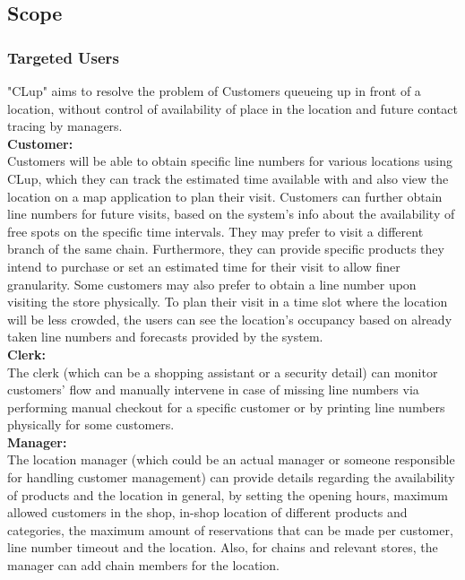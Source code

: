 
\subsection{Scope}

\subsubsection{Targeted Users}

"CLup" aims to resolve the problem of Customers queueing up in front of a location, without control of availability of place in the location and future contact tracing by managers.
\\[0.5cm]
\textbf{Customer:} \\

Customers will be able to obtain specific line numbers for various locations using CLup, which they can track the estimated time available with and also view the location on a map application to plan their visit.
Customers can further obtain line numbers for future visits, based on the system's info about the availability of free spots on the specific time intervals.
They may prefer to visit a different branch of the same chain.
Furthermore, they can provide specific products they intend to purchase or set an estimated time for their visit to allow finer granularity.
Some customers may also prefer to obtain a line number upon visiting the store physically.
To plan their visit in a time slot where the location will be less crowded, the users can see the location's occupancy based on already taken line numbers and forecasts provided by the system.
\\[0.5cm]
\textbf{Clerk:} \\
The clerk (which can be a shopping assistant or a security detail) can monitor customers' flow and manually intervene in case of missing line numbers via performing manual checkout for a specific customer or by printing line numbers physically for some customers.
\\[0.5cm]
\textbf{Manager:} \\

The location manager (which could be an actual manager or someone responsible for handling customer management) can provide details regarding the availability of products and the location in general, by setting the opening hours, maximum allowed customers in the shop, in-shop location of different products and categories, the maximum amount of reservations that can be made per customer, line number timeout and the location.
Also, for chains and relevant stores, the manager can add chain members for the location.

